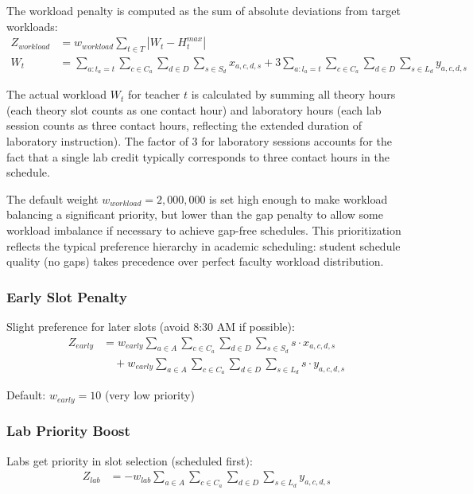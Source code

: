 \documentclass[12pt,a4paper]{article}
\begin{document}
The workload penalty is computed as the sum of absolute deviations from target workloads:
\begin{align}
Z_{workload} &= w_{workload} \sum_{t \in T} |W_t - H_t^{max}| \\
W_t &= \sum_{a: t_a = t} \sum_{c \in C_a} \sum_{d \in D} \sum_{s \in S_d} x_{a,c,d,s} + 3 \sum_{a: l_a = t} \sum_{c \in C_a} \sum_{d \in D} \sum_{s \in L_d} y_{a,c,d,s}
\end{align}

The actual workload $W_t$ for teacher $t$ is calculated by summing all theory hours (each theory slot counts as one contact hour) and laboratory hours (each lab session counts as three contact hours, reflecting the extended duration of laboratory instruction). The factor of 3 for laboratory sessions accounts for the fact that a single lab credit typically corresponds to three contact hours in the schedule.

The default weight $w_{workload} = 2{,}000{,}000$ is set high enough to make workload balancing a significant priority, but lower than the gap penalty to allow some workload imbalance if necessary to achieve gap-free schedules. This prioritization reflects the typical preference hierarchy in academic scheduling: student schedule quality (no gaps) takes precedence over perfect faculty workload distribution.

\subsubsection{Early Slot Penalty}
Slight preference for later slots (avoid 8:30 AM if possible):
\begin{align}
Z_{early} &= w_{early} \sum_{a \in A} \sum_{c \in C_a} \sum_{d \in D} \sum_{s \in S_d} s \cdot x_{a,c,d,s} \\
&\quad + w_{early} \sum_{a \in A} \sum_{c \in C_a} \sum_{d \in D} \sum_{s \in L_d} s \cdot y_{a,c,d,s}
\end{align}

Default: $w_{early} = 10$ (very low priority)

\subsubsection{Lab Priority Boost}
Labs get priority in slot selection (scheduled first):
\begin{align}
Z_{lab} &= -w_{lab} \sum_{a \in A} \sum_{c \in C_a} \sum_{d \in D} \sum_{s \in L_d} y_{a,c,d,s}
\end{align}
\end{document}
